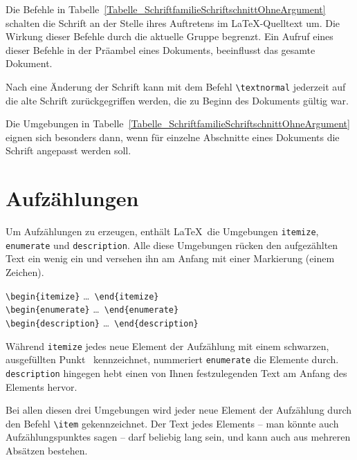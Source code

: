 \documentclass[a4paper,10pt,twoside]{scrbook}
\begin{document}
Die Befehle in Tabelle~\ref{Tabelle_SchriftfamilieSchriftschnittOhneArgument} schalten die Schrift an der Stelle 
ihres Auftretens im \LaTeX-Quelltext um. 
Die Wirkung dieser Befehle durch die aktuelle Gruppe
begrenzt. Ein Aufruf eines dieser Befehle in der Präambel eines Dokuments,
beeinflusst das gesamte Dokument. 

Nach eine Änderung der Schrift kann mit dem Befehl \verb!\textnormal! 
jederzeit auf die alte Schrift zurückgegriffen werden, die zu Beginn des Dokuments gültig war. 


Die Umgebungen in Tabelle~\ref{Tabelle_SchriftfamilieSchriftschnittOhneArgument} eignen sich besonders dann, wenn für einzelne Abschnitte eines Dokuments die Schrift angepasst werden soll. 


\section{Aufzählungen}
\label{Abschnitt_Aufzaehlungen}

Um Aufzählungen zu erzeugen, enthält \LaTeX\ die Umgebungen 
\verb!itemize!, 
\verb!enumerate! und 
\verb!description!. Alle
diese Umgebungen rücken den aufgezählten Text ein wenig ein und versehen ihn am Anfang mit einer Markierung (einem Zeichen).

\begin{boxedminipage}{\textwidth}
	\texttt{\textbackslash begin\{itemize\}} \enskip \dots\ \enskip \texttt{\textbackslash end\{itemize\}} \\
	\texttt{\textbackslash begin\{enumerate\}} \enskip \dots\ \enskip \texttt{\textbackslash end\{enumerate\}} \\
	\texttt{\textbackslash begin\{description\}} \enskip \dots\ \enskip \texttt{\textbackslash end\{description\}}
\end{boxedminipage}

Während \verb!itemize! jedes neue Element der Aufzählung mit einem schwarzen,
ausgefüllten Punkt \textbullet\ kennzeichnet, nummeriert \verb!enumerate! die 
Elemente durch. \verb!description! hingegen hebt einen von Ihnen festzulegenden 
Text am Anfang des Elements hervor.

Bei allen diesen drei Umgebungen wird jeder neue Element der Aufzählung durch
den Befehl \verb!\item! gekennzeichnet. Der Text jedes Elements -- man könnte auch Aufzählungspunktes sagen -- darf beliebig lang sein, und kann auch aus
mehreren Absätzen bestehen. 
\end{document}
